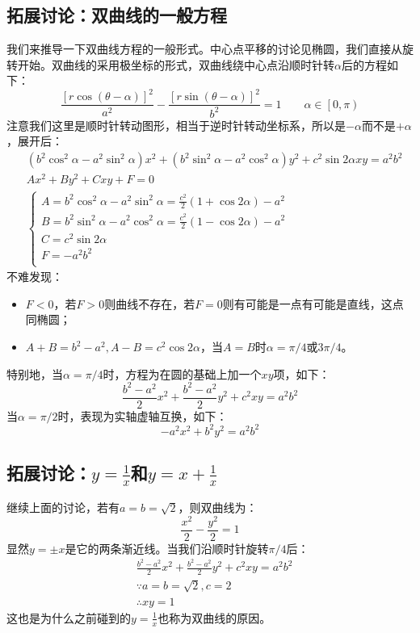 \subsection{拓展讨论：双曲线的一般方程}

我们来推导一下双曲线方程的一般形式。中心点平移的讨论见椭圆，我们直接从旋转开始。双曲线的采用极坐标的形式，双曲线绕中心点沿顺时针转$\alpha $后的方程如下：
\[
\frac{\left[ r\cos \left( \theta -\alpha \right) \right] ^2}{a^2}-\frac{\left[ r\sin \left( \theta -\alpha \right) \right] ^2}{b^2}=1 \qquad \alpha \in \left[ 0,\pi \right)
\]
注意我们这里是顺时针转动图形，相当于逆时针转动坐标系，所以是$-\alpha $而不是$+\alpha $，展开后：
\begin{align*}
&\left( b^2\cos ^2\alpha -a^2\sin ^2\alpha \right) x^2+\left( b^2\sin ^2\alpha -a^2\cos ^2\alpha \right) y^2+c^2\sin 2\alpha xy=a^2b^2 \\
&Ax^2+By^2+Cxy+F=0 \\
&\begin{cases}
	A=b^2\cos ^2\alpha -a^2\sin ^2\alpha =\frac{c^2}{2}\left( 1+\cos 2\alpha \right) -a^2\\
	B=b^2\sin ^2\alpha -a^2\cos ^2\alpha =\frac{c^2}{2}\left( 1-\cos 2\alpha \right) -a^2\\
	C=c^2\sin 2\alpha\\
	F=-a^2b^2\\
\end{cases}
\end{align*}
不难发现：
\begin{itemize}
    \item $F<0$，若$F>0$则曲线不存在，若$F=0$则有可能是一点有可能是直线，这点同椭圆；
    \item $A+B=b^2-a^2,A-B=c^2\cos 2\alpha $，当$A=B$时$\alpha =\pi /4$或$3\pi /4$。
\end{itemize}
特别地，当$\alpha =\pi /4$时，方程为在圆的基础上加一个$xy$项，如下：
\[
\frac{b^2-a^2}{2}x^2+\frac{b^2-a^2}{2}y^2+c^2xy=a^2b^2
\]
当$\alpha =\pi /2$时，表现为实轴虚轴互换，如下：
\[
-a^2x^2+b^2y^2=a^2b^2
\]

\subsection{拓展讨论：\texorpdfstring{$y=\frac{1}{x}$}{y=1/x}和\texorpdfstring{$y=x+\frac{1}{x}$}{y=x+1/x}}

继续上面的讨论，若有$a=b=\sqrt{2}$，则双曲线为：
\[
\frac{x^2}{2}-\frac{y^2}{2}=1
\]
显然$y=\pm x$是它的两条渐近线。当我们沿顺时针旋转$\pi /4$后：
\begin{align*}
&\frac{b^2-a^2}{2}x^2+\frac{b^2-a^2}{2}y^2+c^2xy=a^2b^2 \\
&\because a=b=\sqrt{2},c=2 \\
&\therefore xy=1
\end{align*}
这也是为什么之前碰到的$y=\frac{1}{x}$也称为双曲线的原因。

